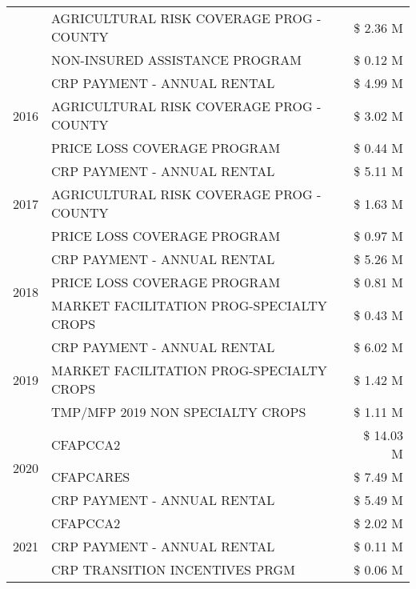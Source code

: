 \begin{tabular}{llr}
 & AGRICULTURAL RISK COVERAGE PROG - COUNTY & \$ 2.36 M \\
 & NON-INSURED ASSISTANCE PROGRAM & \$ 0.12 M \\
\cline{1-3}
\multirow[t]{3}{*}{2016} & CRP PAYMENT - ANNUAL RENTAL & \$ 4.99 M \\
 & AGRICULTURAL RISK COVERAGE PROG - COUNTY & \$ 3.02 M \\
 & PRICE LOSS COVERAGE PROGRAM & \$ 0.44 M \\
\cline{1-3}
\multirow[t]{3}{*}{2017} & CRP PAYMENT - ANNUAL RENTAL & \$ 5.11 M \\
 & AGRICULTURAL RISK COVERAGE PROG - COUNTY & \$ 1.63 M \\
 & PRICE LOSS COVERAGE PROGRAM & \$ 0.97 M \\
\cline{1-3}
\multirow[t]{3}{*}{2018} & CRP PAYMENT - ANNUAL RENTAL & \$ 5.26 M \\
 & PRICE LOSS COVERAGE PROGRAM & \$ 0.81 M \\
 & MARKET FACILITATION PROG-SPECIALTY CROPS & \$ 0.43 M \\
\cline{1-3}
\multirow[t]{3}{*}{2019} & CRP PAYMENT - ANNUAL RENTAL & \$ 6.02 M \\
 & MARKET FACILITATION PROG-SPECIALTY CROPS & \$ 1.42 M \\
 & TMP/MFP 2019 NON SPECIALTY CROPS & \$ 1.11 M \\
\cline{1-3}
\multirow[t]{3}{*}{2020} & CFAPCCA2 & \$ 14.03 M \\
 & CFAPCARES & \$ 7.49 M \\
 & CRP PAYMENT - ANNUAL RENTAL & \$ 5.49 M \\
\cline{1-3}
\multirow[t]{3}{*}{2021} & CFAPCCA2 & \$ 2.02 M \\
 & CRP PAYMENT - ANNUAL RENTAL & \$ 0.11 M \\
 & CRP TRANSITION INCENTIVES PRGM & \$ 0.06 M \\
\cline{1-3}
\bottomrule
\end{tabular}
